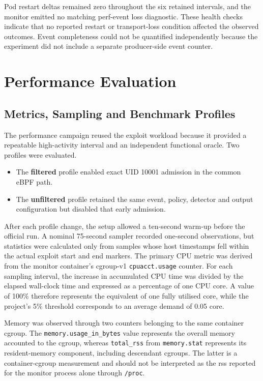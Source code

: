 Pod restart deltas remained zero throughout the six retained intervals, and the
monitor emitted no matching perf-event loss diagnostic. These health checks
indicate that no reported restart or transport-loss condition affected the
observed outcomes. Event completeness could not be quantified independently
because the experiment did not include a separate producer-side event counter.

\section{Performance Evaluation}
\label{sec:evaluation-performance}

\subsection{Metrics, Sampling and Benchmark Profiles}
\label{subsec:evaluation-metrics-profiles}

The performance campaign reused the exploit workload because it provided a
repeatable high-activity interval and an independent functional oracle. Two
profiles were evaluated.

\begin{itemize}
    \item The \textbf{filtered} profile enabled exact UID 10001 admission
    in the common eBPF path.
    \item The \textbf{unfiltered} profile retained the same event, policy,
    detector and output configuration but disabled that early admission.
\end{itemize}

After each profile change, the setup allowed a ten-second warm-up before the
official run. A nominal 75-second sampler recorded one-second observations,
but statistics were calculated only from samples whose host timestamps fell
within the actual exploit start and end markers.
The primary CPU metric was derived from the monitor container's cgroup-v1
\texttt{cpuacct.usage} counter. For each sampling interval, the increase in
accumulated CPU time was divided by the elapsed wall-clock time and expressed as
a percentage of one CPU core. A value of 100\% therefore represents the
equivalent of one fully utilised core, while the project's 5\% threshold
corresponds to an average demand of 0.05 core.

Memory was observed through two counters belonging to the same container
cgroup. The \texttt{memory.usage\_in\_bytes} value represents the overall memory
accounted to the cgroup, whereas \texttt{total\_rss} from
\texttt{memory.stat} represents its resident-memory component, including
descendant cgroups. The latter is a container-cgroup measurement and should not
be interpreted as the \gls{rss} reported for the monitor process alone through
\texttt{/proc}.

